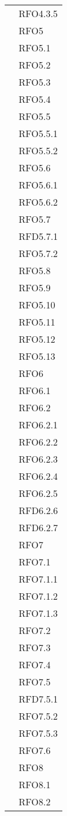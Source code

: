 \begin{longtable}{ p{12cm} | p{4cm} }
			& RFO4.3.5 \\
			& RFO5 \\
			& RFO5.1 \\
			& RFO5.2 \\
			& RFO5.3 \\
			& RFO5.4 \\
			& RFO5.5 \\
			& RFO5.5.1 \\
			& RFO5.5.2 \\
			& RFO5.6 \\
			& RFO5.6.1 \\
			& RFO5.6.2 \\
			& RFO5.7 \\
			& RFD5.7.1 \\
			& RFO5.7.2 \\
			& RFO5.8 \\
			& RFO5.9 \\
			& RFO5.10 \\
			& RFO5.11 \\
			& RFO5.12 \\
			& RFO5.13 \\
			& RFO6 \\
			& RFO6.1 \\
			& RFO6.2 \\
			& RFO6.2.1 \\
			& RFO6.2.2 \\
			& RFO6.2.3 \\
			& RFO6.2.4 \\
			& RFO6.2.5 \\
			& RFD6.2.6 \\
			& RFD6.2.7 \\
			& RFO7 \\
			& RFO7.1 \\
			& RFO7.1.1 \\
			& RFO7.1.2 \\
			& RFO7.1.3 \\
			& RFO7.2 \\
			& RFO7.3 \\
			& RFO7.4 \\
			& RFO7.5 \\
			& RFD7.5.1 \\
			& RFO7.5.2 \\
			& RFO7.5.3 \\
			& RFO7.6 \\
			& RFO8 \\
			& RFO8.1 \\
			& RFO8.2 \\

\end{longtable}
